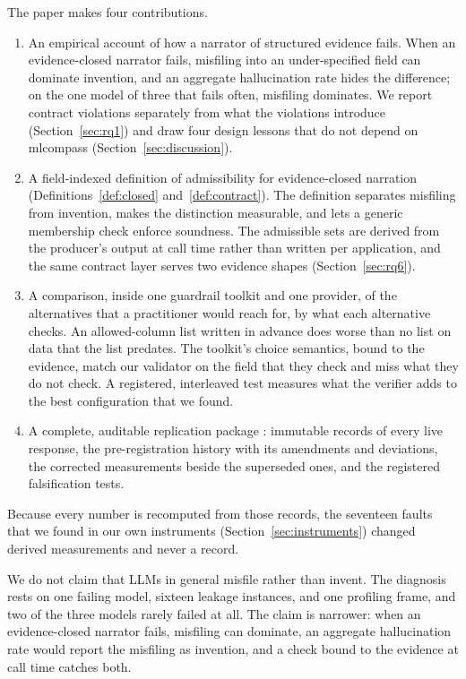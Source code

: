 \documentclass[10pt,twocolumn]{article}
\begin{document}
The paper makes four contributions.
\begin{enumerate}
\item An empirical account of how a narrator of structured evidence fails.
When an evidence-closed narrator fails, misfiling into an under-specified
field can dominate invention, and an aggregate hallucination rate hides the
difference; on the one model of three that fails often, misfiling dominates.
We report contract violations separately from what the violations introduce
(Section~\ref{sec:rq1}) and draw four design lessons that do not depend on
mlcompass (Section~\ref{sec:discussion}).
\item A field-indexed definition of admissibility for evidence-closed narration
(Definitions~\ref{def:closed} and~\ref{def:contract}). The definition
separates misfiling from invention, makes the distinction measurable, and lets
a generic membership check enforce soundness. The admissible sets are derived
from the producer's output at call time rather than written per application,
and the same contract layer serves two evidence shapes
(Section~\ref{sec:rq6}).
\item A comparison, inside one guardrail toolkit and one provider, of the
alternatives that a practitioner would reach for, by what each alternative
checks. An allowed-column list written in advance does worse than no list on
data that the list predates. The toolkit's choice semantics, bound to the
evidence, match our validator on the field that they check and miss what they
do not check. A registered, interleaved test measures what the verifier adds
to the best configuration that we found.
\item A complete, auditable replication package \citep{replication}:
immutable records of every live response, the pre-registration history with its
amendments and deviations, the corrected measurements beside the superseded
ones, and the registered falsification tests.
\end{enumerate}

Because every number is recomputed from those records, the seventeen faults
that we found in our own instruments (Section~\ref{sec:instruments}) changed
derived measurements and never a record.

We do not claim that LLMs in general misfile rather than invent. The
diagnosis rests on one failing model, sixteen leakage instances, and one
profiling frame, and two of the three models rarely failed at all. The claim
is narrower: when an evidence-closed narrator fails, misfiling can dominate,
an aggregate hallucination rate would report the misfiling as invention, and a
check bound to the evidence at call time catches both.
\end{document}
